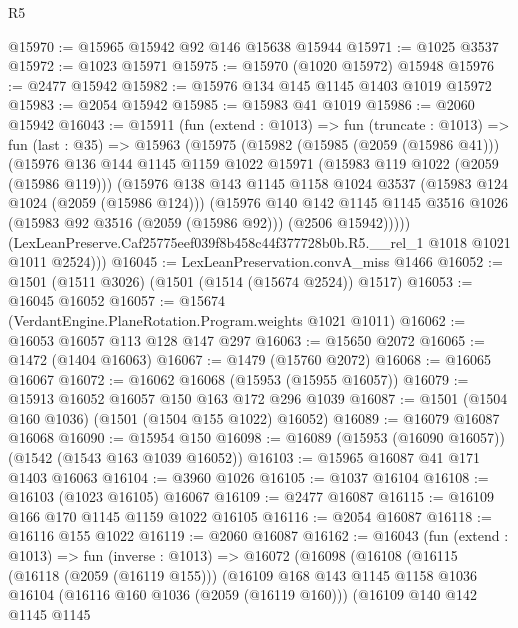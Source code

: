 \begin{lexlean}{R5}
\begin{coremodule}
@15970 := @15965 @15942 @92 @146 @15638 @15944
@15971 := @1025 @3537
@15972 := @1023 @15971
@15975 := @15970 (@1020 @15972) @15948
@15976 := @2477 @15942
@15982 := @15976 @134 @145 @1145 @1403 @1019 @15972
@15983 := @2054 @15942
@15985 := @15983 @41 @1019
@15986 := @2060 @15942
@16043 := @15911
    (fun (extend : @1013) =>
    fun (truncate : @1013) =>
    fun (last : @35) =>
    @15963
      (@15975
        (@15982
          (@15985 (@2059 (@15986 @41)))
          (@15976
            @136
            @144
            @1145
            @1159
            @1022
            @15971
            (@15983 @119 @1022 (@2059 (@15986 @119)))
            (@15976
              @138
              @143
              @1145
              @1158
              @1024
              @3537
              (@15983 @124 @1024 (@2059 (@15986 @124)))
              (@15976
                @140
                @142
                @1145
                @1145
                @3516
                @1026
                (@15983 @92 @3516 (@2059 (@15986 @92)))
                (@2506 @15942)))))
        (LexLeanPreserve.Caf25775eef039f8b458c44f377728b0b.R5.__rel_1 @1018 @1021 @1011 @2524)))
@16045 := LexLeanPreservation.convA_miss @1466
@16052 := @1501 (@1511 @3026) (@1501 (@1514 (@15674 @2524)) @1517)
@16053 := @16045 @16052
@16057 := @15674 (VerdantEngine.PlaneRotation.Program.weights @1021 @1011)
@16062 := @16053 @16057 @113 @128 @147 @297
@16063 := @15650 @2072
@16065 := @1472 (@1404 @16063)
@16067 := @1479 (@15760 @2072)
@16068 := @16065 @16067
@16072 := @16062 @16068 (@15953 (@15955 @16057))
@16079 := @15913 @16052 @16057 @150 @163 @172 @296 @1039
@16087 := @1501 (@1504 @160 @1036) (@1501 (@1504 @155 @1022) @16052)
@16089 := @16079 @16087 @16068
@16090 := @15954 @150
@16098 := @16089 (@15953 (@16090 @16057)) (@1542 (@1543 @163 @1039 @16052))
@16103 := @15965 @16087 @41 @171 @1403 @16063
@16104 := @3960 @1026
@16105 := @1037 @16104
@16108 := @16103 (@1023 @16105) @16067
@16109 := @2477 @16087
@16115 := @16109 @166 @170 @1145 @1159 @1022 @16105
@16116 := @2054 @16087
@16118 := @16116 @155 @1022
@16119 := @2060 @16087
@16162 := @16043
    (fun (extend : @1013) =>
    fun (inverse : @1013) =>
    @16072
      (@16098
        (@16108
          (@16115
            (@16118 (@2059 (@16119 @155)))
            (@16109
              @168
              @143
              @1145
              @1158
              @1036
              @16104
              (@16116 @160 @1036 (@2059 (@16119 @160)))
              (@16109
                @140
                @142
                @1145
                @1145

\end{coremodule}
\end{lexlean}
